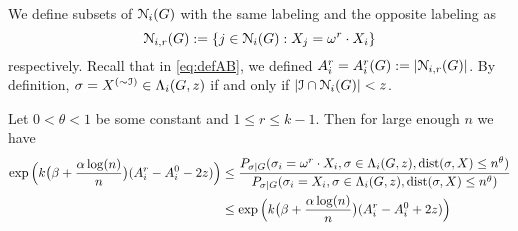 \documentclass{article}
\begin{document}
We define subsets of $\mathcal{N}_i(G)$ with the same labeling and the opposite labeling as
$$
\mathcal{N}_{i,r}(G):=\{j\in \mathcal{N}_i(G): X_j=\omega^r \cdot X_i \}
$$
respectively.
Recall that in \eqref{eq:defAB}, we defined $A^r_i=A^r_i(G):=|\mathcal{N}_{i,r}(G)|$.
By definition, $\sigma = X^{(\sim\mathcal{I})}\in  \Lambda_i(G,z)$ if and only if $|\mathcal{I}\cap \mathcal{N}_i(G)| < z$.


\begin{lemma} \label{lm:et}
Let $0<\theta<1$ be some constant and $1\leq r \leq k-1$. Then for large enough $n$ we have
\begin{align*}
\exp\Big(k\big(\beta+\frac{\alpha\log(n)}{n} \big) (A^r_i-A^0_i - 2z) \Big) & \le 
\frac{P_{\sigma|G}(\sigma_i= \omega^r \cdot X_i, \sigma\in \Lambda_i(G,z) ,\operatorname{dist}(\sigma, X) \le n^{\theta} ) } 
{ P_{\sigma|G}(\sigma_i=X_i, \sigma\in \Lambda_i(G,z) ,\operatorname{dist}(\sigma, X) \le n^{\theta} ) } \\
& \le \exp\Big(k\big(\beta+\frac{\alpha\log(n)}{n} \big) (A^r_i-A^0_i + 2z) \Big)
\end{align*}
\end{lemma}
\end{document}
